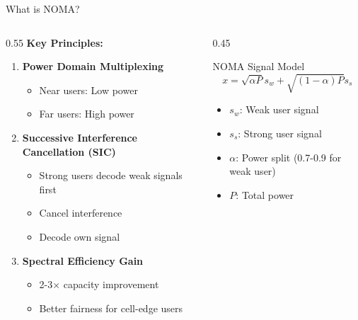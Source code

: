 \documentclass[aspectratio=169]{beamer}
\begin{document}
\begin{frame}{What is NOMA?}
    \begin{columns}
        \begin{column}{0.55\textwidth}
            \textbf{Key Principles:}
            \begin{enumerate}
                \item \textbf{Power Domain Multiplexing}
                \begin{itemize}
                    \item Near users: Low power
                    \item Far users: High power
                \end{itemize}
                
                \item \textbf{Successive Interference Cancellation (SIC)}
                \begin{itemize}
                    \item Strong users decode weak signals first
                    \item Cancel interference
                    \item Decode own signal
                \end{itemize}
                
                \item \textbf{Spectral Efficiency Gain}
                \begin{itemize}
                    \item 2-3× capacity improvement
                    \item Better fairness for cell-edge users
                \end{itemize}
            \end{enumerate}
        \end{column}
        \begin{column}{0.45\textwidth}
            \begin{block}{NOMA Signal Model}
                \begin{equation*}
                    x = \sqrt{\alpha P} s_w + \sqrt{(1-\alpha)P} s_s
                \end{equation*}
                
                \vspace{0.2cm}
                \small
                \begin{itemize}
                    \item $s_w$: Weak user signal
                    \item $s_s$: Strong user signal
                    \item $\alpha$: Power split (0.7-0.9 for weak user)
                    \item $P$: Total power
                \end{itemize}
            \end{block}
            

\end{column}
\end{columns}
\end{frame}
\end{document}
